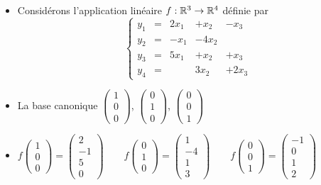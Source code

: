 \begin{frame}
\begin{exemple}
\begin{itemize}[<+->]\setlength{\itemsep}{4pt}
  \item Considérons l'application linéaire $f : \mathbb{R}^3 \to \mathbb{R}^4$ définie par 
$$ \left\{\begin{array}{ccccccc}
y_1 & = & 2x_1  &+ x_2   & -  x_3\\
y_2 & = & -x_1 &-  4x_2 &         \\
y_3 & = & 5x_1  &+  x_2  & +  x_3 \\
y_4 & = &       & 3x_2  & +  2x_3
\end{array}\right.
$$
  
  \item La base canonique   
  $\left(\begin{smallmatrix} 1 \\ 0 \\ 0 \end{smallmatrix} \right)$,
  $\left(\begin{smallmatrix} 0 \\ 1 \\ 0 \end{smallmatrix} \right)$,
  $\left(\begin{smallmatrix} 0 \\ 0 \\ 1 \end{smallmatrix} \right)$
  
  \item $f\left(\begin{smallmatrix} 1 \\ 0 \\ 0 \end{smallmatrix}\right) = \left(\begin{smallmatrix} 2 \\ -1 \\ 5 \\ 0 \end{smallmatrix}\right)\qquad 
  f\left(\begin{smallmatrix} 0 \\ 1 \\ 0 \end{smallmatrix}\right) = \left(\begin{smallmatrix} 1 \\ -4 \\ 1 \\ 3 \end{smallmatrix}\right)\qquad
  f\left(\begin{smallmatrix} 0 \\ 0 \\ 1 \end{smallmatrix}\right) = \left(\begin{smallmatrix} -1 \\ 0 \\ 1 \\ 2 \end{smallmatrix}\right)
  $
  

\end{itemize}
\end{exemple}
\end{frame}
